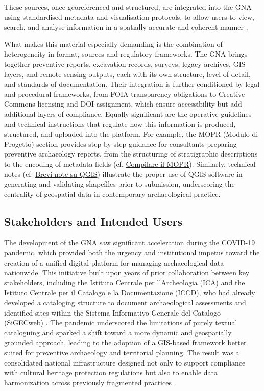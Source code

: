 \begin{spacing}{1.5}
\noindent These sources, once georeferenced and structured, are integrated into the GNA using standardised metadata and visualisation protocols, to allow users to view, search, and analyse information in a spatially accurate and coherent manner \citep{boi_il_2023, acconcia_pubblicazione_2023}.

What makes this material especially demanding is the combination of heterogeneity in format, sources and regulatory frameworks. The GNA brings together preventive reports, excavation records, surveys, legacy archives, GIS layers, and remote sensing outputs, each with its own structure, level of detail, and standards of documentation. Their integration is further conditioned by legal and procedural frameworks, from FOIA transparency obligations to Creative Commons licensing and DOI assignment, which ensure accessibility but add additional layers of compliance. Equally significant are the operative guidelines and technical instructions that regulate how this information is produced, structured, and uploaded into the platform. For example, the MOPR (Modulo di Progetto) section provides step-by-step guidance for consultants preparing preventive archaeology reports, from the structuring of stratigraphic descriptions to the encoding of metadata fields (cf. \href{https://gna.cultura.gov.it/wiki/index.php/Compilare_il_MOPR}{Compilare il MOPR}). Similarly, technical notes (cf. \href{https://gna.cultura.gov.it/wiki/index.php/Brevi_note_su_QGIS}{Brevi note su QGIS}) illustrate the proper use of QGIS software in generating and validating shapefiles prior to submission, underscoring the centrality of geospatial data in contemporary archaeological practice.

\subsection{Stakeholders and Intended Users}\label{sec:gna_plugin}
The development of the GNA saw significant acceleration during the COVID-19 pandemic, which provided both the urgency and institutional impetus toward the creation of a unified digital platform for managing archaeological data nationwide. This initiative built upon years of prior collaboration between key stakeholders, including the Istituto Centrale per l’Archeologia (ICA) and the Istituto Centrale per il Catalogo e la Documentazione (ICCD), who had already developed a cataloging structure to document archaeological assessments and identified sites within the Sistema Informativo Generale del Catalogo (SiGECweb) \citep{calandra_il_2023, boi_il_2023}. The pandemic underscored the limitations of purely textual cataloguing and sparked a shift toward a more dynamic and geospatially grounded approach, leading to the adoption of a GIS-based framework better suited for preventive archaeology and territorial planning. The result was a consolidated national infrastructure designed not only to support compliance with cultural heritage protection regulations but also to enable data harmonization across previously fragmented practices \citep{acconcia_pubblicazione_2023}.


\end{spacing}
